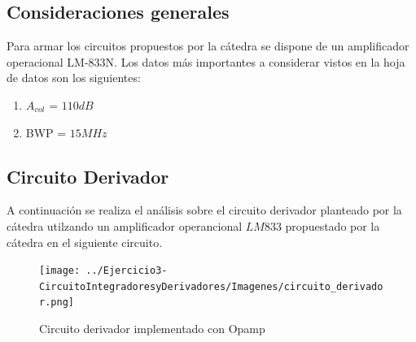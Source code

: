 \subsection{Consideraciones generales}
Para armar los circuitos propuestos por la cátedra se dispone de un
amplificador operacional LM-833N. Los datos más importantes a considerar
vistos en la hoja de datos son los siguientes:
\begin{enumerate}
    \item $A_{vol}$ = $110dB$
    \item BWP = $15 MHz$

\end{enumerate}    

\subsection{Circuito Derivador}
A continuación se realiza el análisis sobre el circuito derivador planteado
por la cátedra utilzando un amplificador operancional $LM833$ propuestado por 
la cátedra en el siguiente circuito.
\begin{figure}[H]
    \centering
    \texttt{[image: ../Ejercicio3-CircuitoIntegradoresyDerivadores/Imagenes/circuito\_derivador.png]}
    \caption{Circuito derivador implementado con Opamp}
\end{figure}

